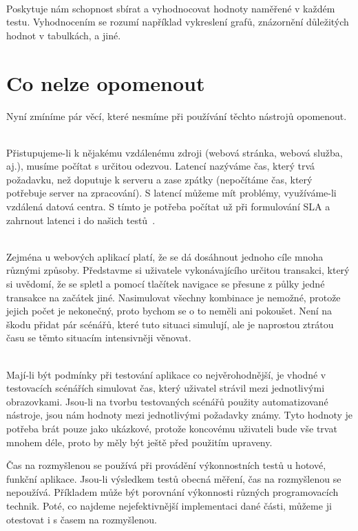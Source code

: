 \documentclass[122pt,oneside]{fithesis}
\begin{document}
\vspace{5 mm}
\\\indent Poskytuje nám schopnost sbírat a vyhodnocovat hodnoty naměřené v každém testu. Vyhodnocením se rozumí například vykreslení grafů, znázornění důležitých hodnot v tabulkách, a jiné.

\section{Co nelze opomenout}
Nyní zmíníme pár věcí, které nesmíme při používání těchto nástrojů opomenout.

\vspace{5 mm}
\\\indent Přistupujeme-li k nějakému vzdálenému zdroji (webová stránka, webová služba, aj.), musíme počítat s určitou odezvou. Latencí nazýváme čas, který trvá požadavku, než doputuje k serveru a zase zpátky (nepočítáme čas, který potřebuje server na zpracování). S latencí můžeme mít problémy, využíváme-li vzdálená datová centra. S tímto je potřeba počítat už při formulování SLA a zahrnout latenci i do našich testů~\cite{bhatt09}.

\vspace{5 mm}
\\\indent Zejména u webových aplikací platí, že se dá dosáhnout jednoho cíle mnoha různými způsoby. Představme si uživatele vykonávajícího určitou transakci, který si uvědomí, že se spletl a pomocí tlačítek navigace se přesune z půlky jedné transakce na začátek jiné. Nasimulovat všechny kombinace je nemožné, protože jejich počet je nekonečný, proto bychom se o to neměli ani pokoušet. Není na škodu přidat pár scénářů, které tuto situaci simulují, ale je naprostou ztrátou času se těmto situacím intensivněji věnovat.

\vspace{5 mm}
\\\indent Mají-li být podmínky při testování aplikace co nejvěrohodnější, je vhodné v testovacích scénářích simulovat čas, který uživatel strávil mezi jednotlivými obrazovkami. Jsou-li na tvorbu testovaných scénářů použity automatizované nástroje, jsou nám hodnoty mezi jednotlivými požadavky známy. Tyto hodnoty je potřeba brát pouze jako ukázkové, protože koncovému uživateli bude vše trvat mnohem déle, proto by měly být ještě před použitím upraveny.

Čas na rozmyšlenou se používá při provádění výkonnostních testů u hotové, funkční aplikace. Jsou-li výsledkem testů obecná měření, čas na rozmyšlenou se nepoužívá. Příkladem může být porovnání výkonnosti různých programovacích technik. Poté, co najdeme nejefektivnější implementaci dané části, můžeme ji otestovat i s časem na rozmyšlenou.
\end{document}
